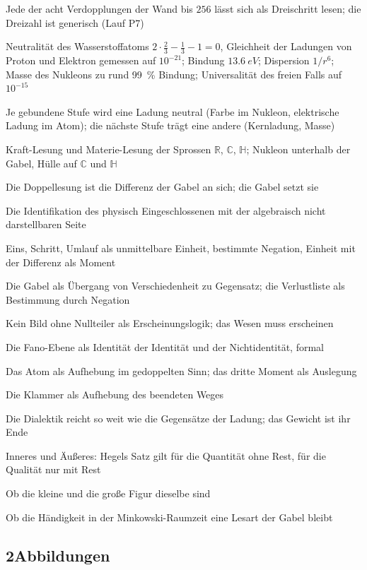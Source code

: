 \documentclass[11pt,a4paper]{article}
\newcommand{\R}{\mathbb R}
\newcommand{\C}{\mathbb C}
\newcommand{\HH}{\mathbb H}
\begin{document}
\begin{description}[itemsep=1pt,font=\normalfont\bfseries]
\item[Satz:] Jede der acht Verdopplungen der Wand bis $256$ lässt sich als Dreischritt lesen; die Dreizahl ist generisch (Lauf P7)
\item[Befund:] Neutralität des Wasserstoffatoms $2\cdot\tfrac23-\tfrac13-1=0$, Gleichheit der Ladungen von Proton und Elektron gemessen auf $10^{-21}$; Bindung $\SI{13.6}{eV}$; Dispersion $1/r^6$; Masse des Nukleons zu rund \SI{99}{\percent} Bindung; Universalität des freien Falls auf $10^{-15}$
\item[Befund:] Je gebundene Stufe wird eine Ladung neutral (Farbe im Nukleon, elektrische Ladung im Atom); die nächste Stufe trägt eine andere (Kernladung, Masse)
\item[These:] Kraft-Lesung und Materie-Lesung der Sprossen $\R$, $\C$, $\HH$; Nukleon unterhalb der Gabel, Hülle auf $\C$ und $\HH$
\item[These:] Die Doppellesung ist die Differenz der Gabel an sich; die Gabel setzt sie
\item[These:] Die Identifikation des physisch Eingeschlossenen mit der algebraisch nicht darstellbaren Seite
\item[Deutung:] Eins, Schritt, Umlauf als unmittelbare Einheit, bestimmte Negation, Einheit mit der Differenz als Moment
\item[Deutung:] Die Gabel als Übergang von Verschiedenheit zu Gegensatz; die Verlustliste als Bestimmung durch Negation
\item[Deutung:] Kein Bild ohne Nullteiler als Erscheinungslogik; das Wesen muss erscheinen
\item[Deutung:] Die Fano-Ebene als Identität der Identität und der Nichtidentität, formal
\item[Deutung:] Das Atom als Aufhebung im gedoppelten Sinn; das dritte Moment als Auslegung
\item[Deutung:] Die Klammer als Aufhebung des beendeten Weges
\item[Deutung:] Die Dialektik reicht so weit wie die Gegensätze der Ladung; das Gewicht ist ihr Ende
\item[Deutung:] Inneres und Äußeres: Hegels Satz gilt für die Quantität ohne Rest, für die Qualität nur mit Rest
\item[Offen:] Ob die kleine und die große Figur dieselbe sind
\item[Offen:] Ob die Händigkeit in der Minkowski-Raumzeit eine Lesart der Gabel bleibt
\end{description}

\subsection*{2\quad Abbildungen}
\end{document}
